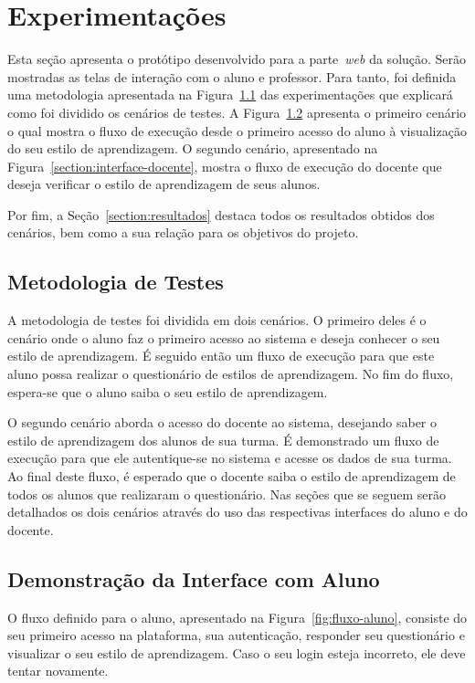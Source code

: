 \chapter{Experimentações}

Esta seção apresenta o protótipo desenvolvido para a parte~\emph{web} da solução. Serão mostradas as telas de interação com o aluno e professor. Para tanto, foi definida uma metodologia apresentada na Figura~\ref{section:metodologia-testes} das experimentações que explicará como foi dividido os cenários de testes.
A Figura~\ref{section:interface-aluno} apresenta o primeiro cenário o qual mostra o fluxo de execução desde o primeiro acesso do aluno à visualização do seu estilo de aprendizagem. O segundo cenário, apresentado na Figura~\ref{section:interface-docente}, mostra o fluxo de execução do docente que deseja verificar o estilo de aprendizagem de seus alunos.

Por fim, a Seção~\ref{section:resultados} destaca todos os resultados obtidos dos cenários, bem como a sua relação para os objetivos do projeto.

\section{Metodologia de Testes}\label{section:metodologia-testes}

A metodologia de testes foi dividida em dois cenários. O primeiro deles é o cenário onde o aluno faz o primeiro acesso ao sistema e deseja conhecer o seu estilo de aprendizagem. É seguido então um fluxo de execução para que este aluno possa realizar o questionário de estilos de aprendizagem. No fim do fluxo, espera-se que o aluno saiba o seu estilo de aprendizagem.

O segundo cenário aborda o acesso do docente ao sistema, desejando saber o estilo de aprendizagem dos alunos de sua turma. É demonstrado um fluxo de execução para que ele autentique-se no sistema e acesse os dados de sua turma. Ao final deste fluxo, é esperado que o docente saiba o estilo de aprendizagem de todos os alunos que realizaram o questionário. Nas seções que se seguem serão detalhados os dois cenários através do uso das respectivas interfaces do aluno e do docente.

\section{Demonstração da Interface com Aluno}\label{section:interface-aluno}
O fluxo definido para o aluno, apresentado na Figura~\ref{fig:fluxo-aluno}, consiste do seu primeiro acesso na plataforma, sua autenticação, responder seu questionário e visualizar o seu estilo de aprendizagem. Caso o seu login esteja incorreto, ele deve tentar novamente.

